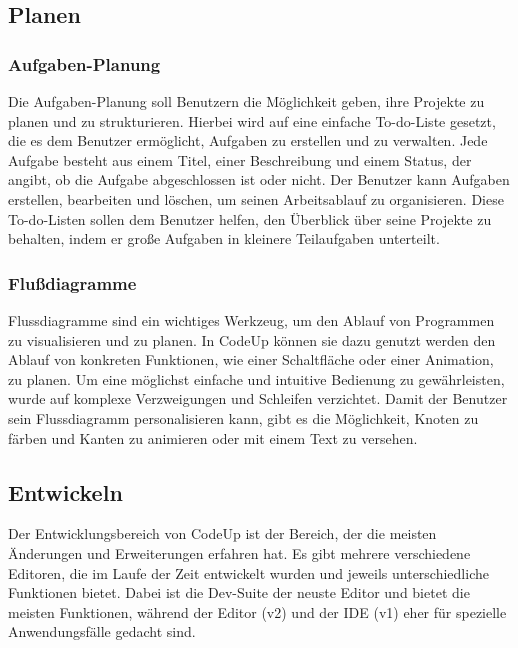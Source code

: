 \documentclass[main.tex]{subfiles}
\begin{document}
    \subsection{Planen}
    \subsubsection{Aufgaben-Planung}
    Die Aufgaben-Planung soll Benutzern die Möglichkeit geben, ihre Projekte zu planen und zu strukturieren.
    Hierbei wird auf eine einfache To-do-Liste gesetzt, die es dem Benutzer ermöglicht, Aufgaben zu erstellen und zu verwalten.
    Jede Aufgabe besteht aus einem Titel, einer Beschreibung und einem Status, der angibt, ob die Aufgabe abgeschlossen ist oder nicht.
    Der Benutzer kann Aufgaben erstellen, bearbeiten und löschen, um seinen Arbeitsablauf zu organisieren.
    Diese To-do-Listen sollen dem Benutzer helfen, den Überblick über seine Projekte zu behalten, indem er große Aufgaben in kleinere Teilaufgaben unterteilt.
    \subsubsection{Flußdiagramme}
    Flussdiagramme sind ein wichtiges Werkzeug, um den Ablauf von Programmen zu visualisieren und zu planen.
    In CodeUp können sie dazu genutzt werden den Ablauf von konkreten Funktionen, wie einer Schaltfläche oder einer Animation, zu planen.
    Um eine möglichst einfache und intuitive Bedienung zu gewährleisten, wurde auf komplexe Verzweigungen und Schleifen verzichtet.
    Damit der Benutzer sein Flussdiagramm personalisieren kann, gibt es die Möglichkeit, Knoten zu färben und Kanten zu animieren oder mit einem Text zu versehen.
    \subsection{Entwickeln}
    Der Entwicklungsbereich von CodeUp ist der Bereich, der die meisten Änderungen und Erweiterungen erfahren hat.
    Es gibt mehrere verschiedene Editoren, die im Laufe der Zeit entwickelt wurden und jeweils unterschiedliche Funktionen bietet.
    Dabei ist die Dev-Suite der neuste Editor und bietet die meisten Funktionen, während der Editor (v2) und der IDE (v1) eher für spezielle Anwendungsfälle gedacht sind.
\end{document}
